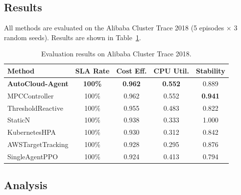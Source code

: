 \documentclass[12pt,a4paper]{article}
\begin{document}
\subsection{Results}

All methods are evaluated on the Alibaba Cluster Trace 2018 (5 episodes $\times$
3 random seeds). Results are shown in Table~\ref{tab:results}.

\begin{table}[H]
\centering
\caption{Evaluation results on Alibaba Cluster Trace 2018.}
\label{tab:results}
\begin{tabular}{lcccc}
\toprule
\textbf{Method} & \textbf{SLA Rate} & \textbf{Cost Eff.} & \textbf{CPU Util.} & \textbf{Stability} \\
\midrule
\textbf{AutoCloud-Agent} & \textbf{100\%} & \textbf{0.962} & \textbf{0.552} & 0.889 \\
MPCController & 100\% & 0.962 & 0.552 & \textbf{0.941} \\
ThresholdReactive & 100\% & 0.955 & 0.483 & 0.822 \\
StaticN & 100\% & 0.938 & 0.333 & 1.000 \\
KubernetesHPA & 100\% & 0.930 & 0.312 & 0.842 \\
AWSTargetTracking & 100\% & 0.928 & 0.295 & 0.876 \\
SingleAgentPPO & 100\% & 0.924 & 0.413 & 0.794 \\
\bottomrule
\end{tabular}
\end{table}

\subsection{Analysis}
\end{document}
